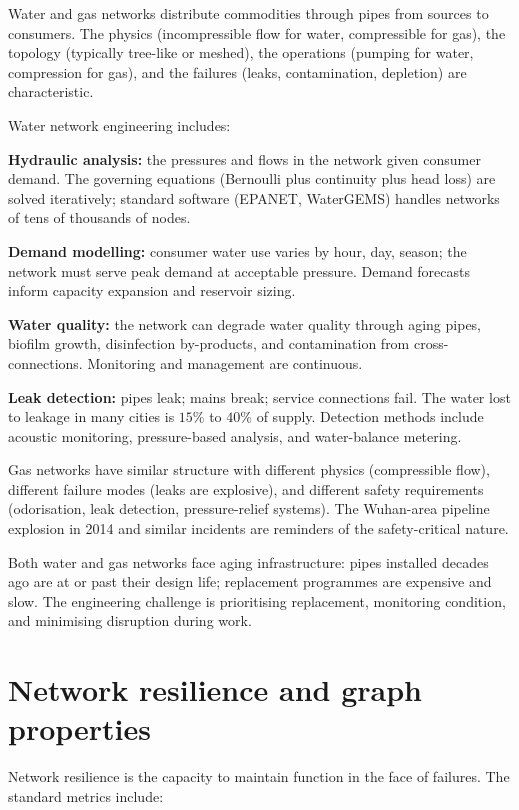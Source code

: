 Water and gas networks distribute commodities through pipes from sources to consumers. The physics (incompressible flow for water, compressible for gas), the topology (typically tree-like or meshed), the operations (pumping for water, compression for gas), and the failures (leaks, contamination, depletion) are characteristic.

Water network engineering includes:

\textbf{Hydraulic analysis:} the pressures and flows in the network given consumer demand. The governing equations (Bernoulli plus continuity plus head loss) are solved iteratively; standard software (EPANET, WaterGEMS) handles networks of tens of thousands of nodes.

\textbf{Demand modelling:} consumer water use varies by hour, day, season; the network must serve peak demand at acceptable pressure. Demand forecasts inform capacity expansion and reservoir sizing.

\textbf{Water quality:} the network can degrade water quality through aging pipes, biofilm growth, disinfection by-products, and contamination from cross-connections. Monitoring and management are continuous.

\textbf{Leak detection:} pipes leak; mains break; service connections fail. The water lost to leakage in many cities is $15\%$ to $40\%$ of supply. Detection methods include acoustic monitoring, pressure-based analysis, and water-balance metering.

Gas networks have similar structure with different physics (compressible flow), different failure modes (leaks are explosive), and different safety requirements (odorisation, leak detection, pressure-relief systems). The Wuhan-area pipeline explosion in 2014 and similar incidents are reminders of the safety-critical nature.

Both water and gas networks face aging infrastructure: pipes installed decades ago are at or past their design life; replacement programmes are expensive and slow. The engineering challenge is prioritising replacement, monitoring condition, and minimising disruption during work.

\section{Network resilience and graph properties}

Network resilience is the capacity to maintain function in the face of failures. The standard metrics include:

